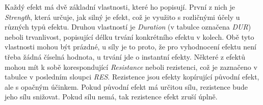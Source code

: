 Každý efekt má dvě základní vlastnosti, které ho popisují. První z nich je \textit{Strength}, která určuje, jak silný je efekt, což je využito s rozličnými účely u různých typů efektu. Druhou vlastností je \textit{Duration} (v tabulce označena \textit{DUR}) neboli trvanlivost, popisující délku trvání konkrétního efektu v kolech. Obě tyto vlastnosti mohou být prázdné, u síly je to proto, že pro vyhodnocení efektu není třeba žádná číselná hodnota, u trvání jde o instantní efekty. Některé z efektů mohou mít k sobě korespondující \textit{Resistance} neboli rezistenci, což je zaznačeno v tabulce v posledním sloupci \textit{RES}. Rezistence jsou efekty kopírující původní efekt, ale s opačným účinkem. Pokud původní efekt má určitou sílu, rezistence bude jeho sílu snižovat. Pokud sílu nemá, tak rezistence efekt zruší úplně.

